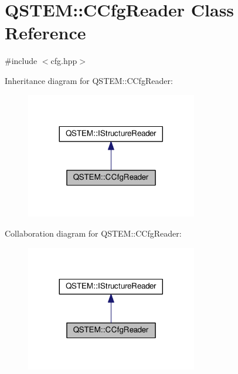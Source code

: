\hypertarget{class_q_s_t_e_m_1_1_c_cfg_reader}{\section{Q\-S\-T\-E\-M\-:\-:C\-Cfg\-Reader Class Reference}
\label{class_q_s_t_e_m_1_1_c_cfg_reader}
}


{\ttfamily \#include $<$cfg.\-hpp$>$}



Inheritance diagram for Q\-S\-T\-E\-M\-:\-:C\-Cfg\-Reader\-:
\nopagebreak
\begin{figure}[H]
\begin{center}
\leavevmode
\includegraphics[width=212pt]{class_q_s_t_e_m_1_1_c_cfg_reader__inherit__graph}
\end{center}
\end{figure}


Collaboration diagram for Q\-S\-T\-E\-M\-:\-:C\-Cfg\-Reader\-:
\nopagebreak
\begin{figure}[H]
\begin{center}
\leavevmode
\includegraphics[width=212pt]{class_q_s_t_e_m_1_1_c_cfg_reader__coll__graph}
\end{center}
\end{figure}
